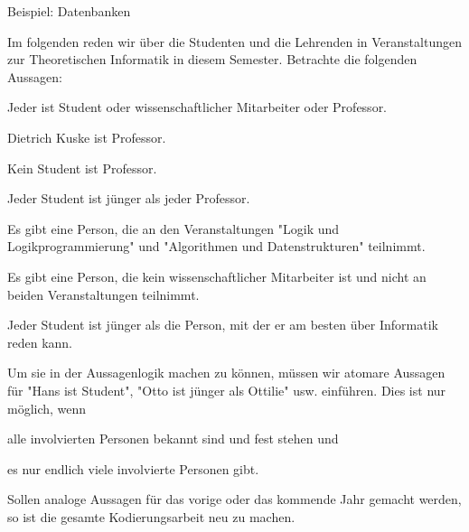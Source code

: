 \documentclass[a4paper]{article}
\begin{document}
\begin{multicols}{3}
  Beispiel: Datenbanken
  \begin{itemize*}
    \item Im folgenden reden wir über die Studenten und die Lehrenden in Veranstaltungen zur Theoretischen Informatik in diesem Semester. Betrachte die folgenden Aussagen:
    \begin{itemize*}
      \item Jeder ist Student oder wissenschaftlicher Mitarbeiter oder Professor.
      \item Dietrich Kuske ist Professor.
      \item Kein Student ist Professor.
      \item Jeder Student ist jünger als jeder Professor.
      \item Es gibt eine Person, die an den Veranstaltungen "Logik und Logikprogrammierung" und "Algorithmen und Datenstrukturen" teilnimmt.
      \item Es gibt eine Person, die kein wissenschaftlicher Mitarbeiter ist und nicht an beiden Veranstaltungen teilnimmt.
      \item Jeder Student ist jünger als die Person, mit der er am besten über Informatik reden kann.
    \end{itemize*}
    \item Um sie in der Aussagenlogik machen zu können, müssen wir atomare Aussagen für "Hans ist Student", "Otto ist jünger als Ottilie" usw. einführen. Dies ist nur möglich, wenn
    \begin{enumerate*}
      \item  alle involvierten Personen bekannt sind und fest stehen und
      \item es nur endlich viele involvierte Personen gibt.
    \end{enumerate*}
    \item Sollen analoge Aussagen für das vorige oder das kommende Jahr gemacht werden, so ist die gesamte Kodierungsarbeit neu zu machen.
  \end{itemize*}



\end{multicols}
\end{document}
